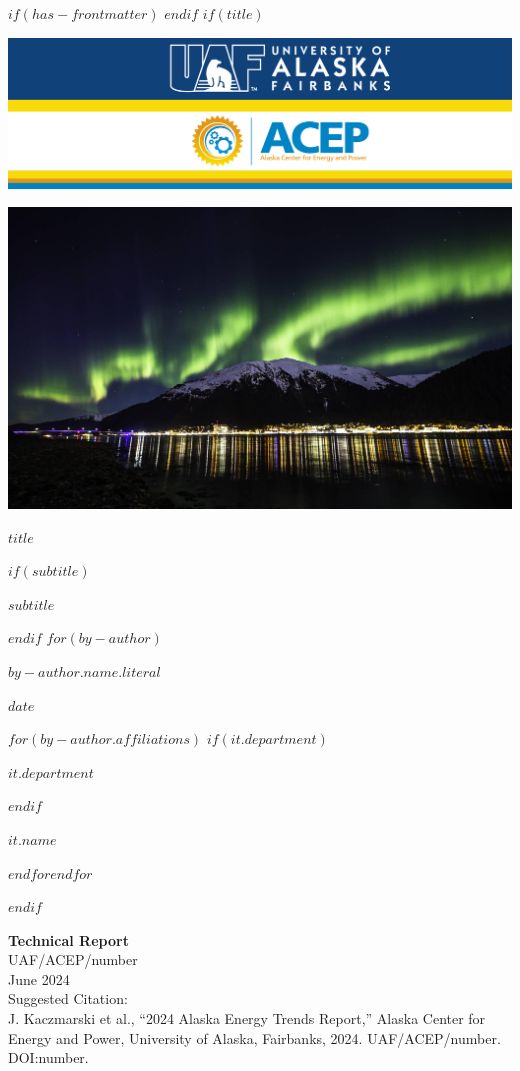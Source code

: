 $if(has-frontmatter)$
\frontmatter
$endif$
$if(title)$
\cleardoublepage
\thispagestyle{empty}
{\centering
\par\noindent\includegraphics[width=\textwidth]{images/banner_acep_uaf.png}
\vspace{1ex}
\par\noindent\includegraphics[width=\textwidth]{images/jnu_aurora.jpeg}
\\
{\huge\bfseries $title$ \par}
$if(subtitle)$
{\Large $subtitle$ \par}
$endif$
\vspace{3ex}
$for(by-author)$
{\Large $by-author.name.literal$ \par}
\vspace{3ex}
{\bfseries\large $date$ \par}
\vspace{12ex}
$for(by-author.affiliations)$%
$if(it.department)$%
{\bfseries\large $it.department$ \par}
\vspace{3ex}
$endif$%
{\bfseries\large $it.name$ \par}
$endfor$$endfor$%
}
$endif$

\newpage
\thispagestyle{empty}
\noindent
{\normalsize\bfseries Technical Report} \\
UAF/ACEP/number \\ 
\vspace{3ex}
June 2024 \\
Suggested Citation: \\
J. Kaczmarski et al., “2024 Alaska Energy Trends Report,” Alaska Center for Energy and Power, University of Alaska, Fairbanks, 2024. UAF/ACEP/number. DOI:number. 

